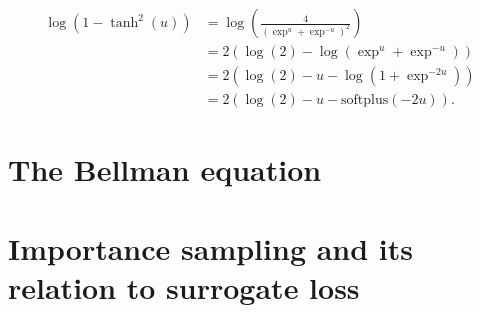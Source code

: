 \begin{equation}
\label{eq:logprob_openai}
\begin{aligned}
	\log \left( 1 - \tanh^2(u) \right) 	&= \log \left( \frac{4}{\left(\exp^u + \exp^{-u}\right)^2} \right)\\
							&= 2 \left( \log(2) - \log \left( \exp^u + \exp^{-u} \right) \right)\\
							&= 2 \left( \log(2) - u - \log \left( 1 + \exp^{-2u} \right) \right)\\
							&= 2 \left( \log(2) - u - \text{softplus} (-2u) \right).
\end{aligned}
\end{equation}

\section{The Bellman equation}

\section{Importance sampling and its relation to surrogate loss}